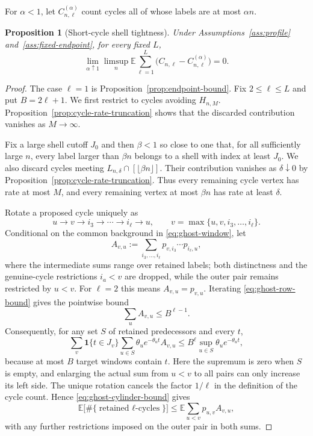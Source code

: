 \documentclass[11pt]{article}
\newtheorem{proposition}[theorem]{Proposition}
\theoremstyle{remark}
\theoremstyle{plain}
\newcommand{\E}{\mathbb E}
\newcommand{\one}{\mathbf 1}
\begin{document}
For $\alpha<1$, let $C_{n,\ell}^{(\alpha)}$ count cycles all of whose labels
are at most $\alpha n$.

\begin{proposition}[Short-cycle shell tightness]
\label{prop:cycle-endpoint-bound}
Under Assumptions~\ref{ass:profile} and~\ref{ass:fixed-endpoint}, for every
fixed $L$,
\begin{equation}\label{eq:cycle-tail-tightness}
 \lim_{\alpha\uparrow1}\limsup_n
 \E\sum_{\ell=1}^L
 \bigl(C_{n,\ell}-C_{n,\ell}^{(\alpha)}\bigr)=0.
\end{equation}
\end{proposition}

\begin{proof}
The case $\ell=1$ is Proposition~\ref{prop:endpoint-bound}.  Fix
$2\le\ell\le L$ and put $B=2\ell+1$.  We first restrict to cycles avoiding
$H_{n,M}$.  Proposition~\ref{prop:cycle-rate-truncation} shows that the
discarded contribution vanishes as $M\to\infty$.

Fix a large shell cutoff $J_0$ and then $\beta<1$ so close to one that, for
all sufficiently large $n$, every label larger than $\beta n$ belongs to a
shell with index at least $J_0$.  We also discard cycles meeting
$L_{n,\delta}\cap[\lfloor\beta n\rfloor]$.  Their contribution vanishes as
$\delta\downarrow0$ by Proposition~\ref{prop:cycle-rate-truncation}.
Thus every remaining cycle vertex has rate at most $M$, and every remaining
vertex at most $\beta n$ has rate at least $\delta$.

Rotate a proposed cycle uniquely as
\[
 u\longrightarrow v\longrightarrow i_3\longrightarrow\cdots
 \longrightarrow i_\ell\longrightarrow u,
 \qquad v=\max\{u,v,i_3,\ldots,i_\ell\}.
\]
Conditional on the common background in \eqref{eq:ghost-window}, let
\[
 A_{v,u}:=\sum_{i_3,\ldots,i_\ell}
 p_{v,i_3}\cdots p_{i_\ell,u},
\]
where the intermediate sums range over retained labels; both distinctness
and the genuine-cycle restrictions $i_a<v$ are dropped, while the outer pair
remains restricted by $u<v$.  For $\ell=2$ this means
$A_{v,u}=p_{v,u}$.  Iterating
\eqref{eq:ghost-row-bound} gives the pointwise bound
\begin{equation}\label{eq:marked-return-bound}
 \sum_u A_{v,u}\le B^{\ell-1}.
\end{equation}
Consequently, for any set $S$ of retained predecessors and every $t$,
\begin{equation}\label{eq:marked-edge-bound}
 \sum_v\one\{t\in J_v\}\sum_{u\in S}
 \theta_u e^{-\theta_ut}A_{v,u}
 \le B^\ell\sup_{u\in S}\theta_u e^{-\theta_ut},
\end{equation}
because at most $B$ target windows contain $t$.
Here the supremum is zero when $S$ is empty, and enlarging the actual sum
from $u<v$ to all pairs can only increase its left side.
The unique rotation cancels the factor $1/\ell$ in the definition of the
cycle count.  Hence \eqref{eq:ghost-cylinder-bound} gives
\[
 \E\bigl[\#\{\text{retained $\ell$-cycles}\}\bigr]
 \le \E\sum_{u<v}p_{u,v}A_{v,u},
\]
with any further restrictions imposed on the outer pair in both sums.


\end{proof}
\end{document}
